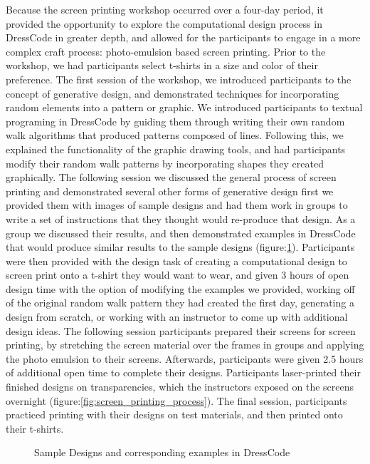 \documentclass{sigchi}
\begin{document}
Because the screen printing workshop occurred over a four-day period, it provided the opportunity to explore the computational design process in DressCode in greater depth, and allowed for the participants to engage in a more complex craft process: photo-emulsion based screen printing. Prior to the workshop, we had participants select t-shirts in a size and color of their preference. The first session of the workshop, we introduced participants to the concept of generative design, and demonstrated techniques for incorporating random elements into a pattern or graphic. We introduced participants to textual programing in DressCode by guiding them through writing their own random walk algorithms that produced patterns composed of lines. Following this, we explained the functionality of the graphic drawing tools, and had participants modify their random walk patterns by incorporating shapes they created graphically. The following session we discussed the general process of screen printing and demonstrated several other forms of generative design first we provided them with images of sample designs and had them work in groups to write a set of instructions that they thought would re-produce that design. As a group we discussed their results, and then demonstrated examples in DressCode that would produce similar results to the sample designs (figure:\ref{fig:example_designs}). Participants were then provided with the design task of creating a computational design to screen print onto a t-shirt they would want to wear, and given 3 hours of open design time with the option of modifying the examples we provided, working off of the original random walk pattern they had created the first day, generating a design from scratch, or working with an instructor to come up with additional design ideas. The following session participants prepared their screens for screen printing, by stretching the screen material over the frames in groups and applying the photo emulsion to their screens. Afterwards, participants were given 2.5 hours of additional open time to complete their designs. Participants laser-printed their finished designs on transparencies, which the instructors exposed on the screens overnight (figure:\ref{fig:screen_printing_process}). The final session, participants practiced printing with their designs on test materials, and then printed onto their t-shirts.

\begin{center}
\begin{figure}[h!]
\caption{Sample Designs and corresponding examples in DressCode}
\label{fig:example_designs}
\end{figure}
\end{center}
\end{document}
